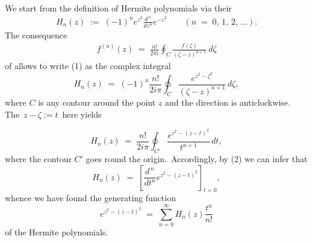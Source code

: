 \documentclass[12pt]{article}
\theoremstyle{definition}
\begin{document}
We start from the definition of Hermite polynomials via their 
\begin{align}
H_n(z) \;:=\; (-1)^ne^{z^2}\frac{d^{\,n}}{dz^n}e^{-z^2} \qquad (n \;=\; 0,\,1,\,2,\,\ldots).
\end{align}
The consequence 
\begin{align}
f^{(n)}(z) \;=\; \frac{n!}{2 \pi i} \oint_C \frac{f(\zeta)}{(\zeta-z)^{n+1}}\ d\zeta
\end{align}
of  allows to write (1) as the complex integral
$$H_n(z) \;=\; (-1)^n\frac{n!}{2i\pi}\oint_C\frac{e^{z^2-\zeta^2}}{(\zeta\!-\!z)^{n+1}}\,d\zeta,$$
where $C$ is any  contour around the point $z$ and the direction is anticlockwise.\, The  \,$z\!-\!\zeta := t$\, here yields

$$H_n(z) \;=\; \frac{n!}{2i\pi}\oint_{C'}\frac{e^{z^2-(z-t)^2}}{t^{n+1}}\,dt,$$
where the contour $C'$ goes round the origin.\, Accordingly, by (2) we can infer that
$$H_n(z) \;=\; \left[\frac{d^{\,n}}{dt^n}e^{z^2-(z-t)^2}\right]_{t=0},$$
whence we have found the generating function
$$e^{z^2-(z-t)^2} \;=\; \sum_{n=0}^\infty H_n(z)\frac{t^n}{n!}$$
of the Hermite polynomials.



\end{document}
